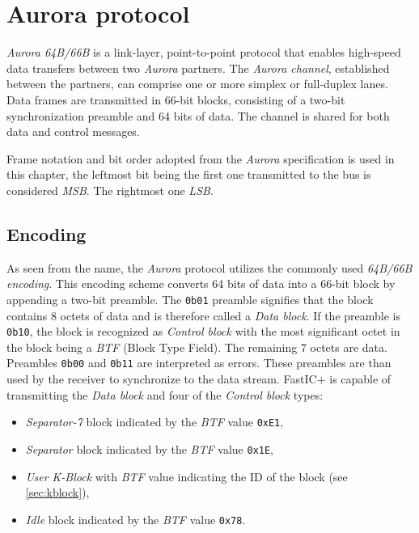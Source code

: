 
\chapter{Aurora protocol}
\emph{Aurora 64B/66B} is a link-layer, point-to-point protocol that enables high-speed data transfers between two \emph{Aurora} partners. The \emph{Aurora channel}, established between the partners, can comprise one or more simplex or full-duplex lanes. Data frames are transmitted in 66-bit blocks, consisting of a two-bit synchronization preamble and 64 bits of data. The channel is shared for both data and control messages. \cite{auroraSpec}

Frame notation and bit order adopted from the \emph{Aurora} specification \cite{auroraSpec} is used in this chapter, the leftmost bit being the first one transmitted to the bus is considered \emph{MSB}. The rightmost one \emph{LSB}.
%
\section{Encoding}
As seen from the name, the \emph{Aurora} protocol utilizes the commonly used \emph{64B/66B encoding}. This encoding scheme converts 64 bits of data into a 66-bit block by appending a two-bit preamble. The \verb|0b01| preamble signifies that the block contains 8 octets of data and is therefore called a \emph{Data block}. If the preamble is \verb|0b10|, the block is recognized as \emph{Control block} with the most significant octet in the block being a \emph{BTF} (Block Type Field). The remaining 7 octets are data. Preambles \verb|0b00| and \verb|0b11| are interpreted as errors. These preambles are than used by the receiver to synchronize to the data stream. \cite{auroraSpec}
\newline\newline
FastIC+ is capable of transmitting the \emph{Data block} and four of the \emph{Control block} types: \cite{ficDatasheet}
\begin{itemize}
    \item \emph{Separator-7} block indicated by the \emph{BTF} value \verb|0xE1|,
    \item \emph{Separator} block indicated by the \emph{BTF} value \verb|0x1E|,
    \item \emph{User K-Block} with \emph{BTF} value indicating the ID of the block (see \ref{sec:kblock}),
    \item \emph{Idle} block indicated by the \emph{BTF} value \verb|0x78|.
\end{itemize}

